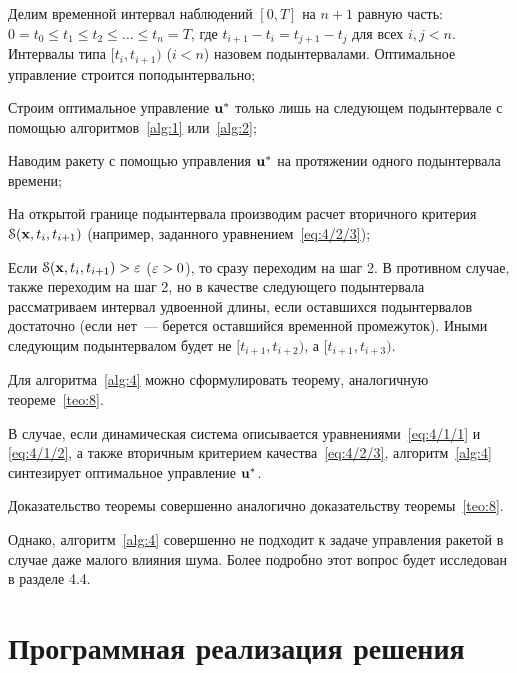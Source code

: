 	\benum
		\item
			Делим временной интервал наблюдений $[0, T]$ на $n+1$ равную часть: $0 = t_0 \leqslant t_1 \leqslant t_2 \leqslant \ldots \leqslant t_{n} = T$, где $t_{i+1}-t_i = t_{j+1}-t_j$ для всех $i, j < n$. Интервалы типа $[t_i, t_{i+1})$ ($i<n$) назовем подынтервалами. Оптимальное управление строится поподынтервально;
		
		\item
			Строим оптимальное управление $\mathbf{u}^{*}$ только лишь на следующем подынтервале с помощью алгоритмов~\ref{alg:1} или~\vref{alg:2};
		
		\item
			Наводим ракету с помощью управления $\mathbf{u}^{*}$ на протяжении одного подынтервала времени;
		
		\item
			На открытой границе подынтервала производим расчет вторичного критерия $\mathcal{S}(\mathbf{x}, t_i, t_{i+1})$ (например, заданного уравнением~\ref{eq:4/2/3});
			
		\item
			Если $\mathcal{S}(\mathbf{x}, t_i, t_{i+1}) > \varepsilon$ ($\varepsilon > 0$), то сразу переходим на шаг 2. В противном случае, также переходим на шаг 2, но в качестве следующего подынтервала рассматриваем интервал удвоенной длины, если оставшихся подынтервалов достаточно (если нет~--- берется оставшийся временной промежуток). Иными следующим подынтервалом будет не $[t_{i+1}, t_{i+2})$, а $[t_{i+1}, t_{i+3})$.
	\eenum
\ealgo

Для алгоритма~\ref{alg:4} можно сформулировать теорему, аналогичную теореме~\ref{teo:8}.

    В случае, если динамическая система описывается уравнениями~\ref{eq:4/1/1} и \vref{eq:4/1/2}, а также вторичным критерием качества~\vref{eq:4/2/3}, алгоритм~\ref{alg:4} синтезирует оптимальное управление $\mathbf{u}^{*}$.
\eteo

Доказательство теоремы совершенно аналогично доказательству теоремы~\ref{teo:8}.

Однако, алгоритм~\ref{alg:4} совершенно не подходит к задаче управления ракетой в случае даже малого влияния шума. Более подробно этот вопрос будет исследован в разделе 4.4.



\section{Программная реализация решения}



